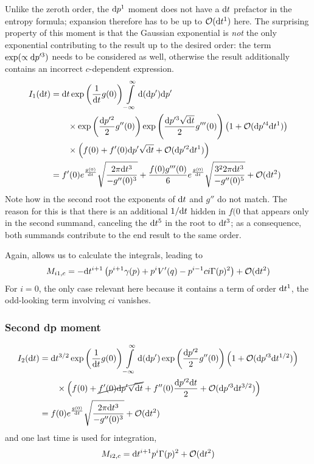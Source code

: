 Unlike the zeroth order, the \(\mathrm{d} p^1\) moment does not have a \(\mathrm{d} t\) prefactor in the entropy formula; expansion therefore has to be up to \(\mathcal{O}(\mathrm{d} t^1)\) here. The surprising property of this moment is that the Gaussian exponential is \emph{not} the only exponential contributing to the result up to the desired order: the term \(\operatorname{exp}(\propto\mathrm{d} p'^3)\) needs to be considered as well, otherwise the result additionally contains an incorrect \(c\)-dependent expression.
%
\begin{align*}
	I_1(\mathrm{d} t)
	&=
	\mathrm{d} t\operatorname{exp}\left(\frac1{\mathrm{d} t}g(0)\right)
	\int\limits_{-\infty}^\infty\mathrm{d}(\mathrm{d} p')\mathrm{d} p'
	\\&\qquad\times
		\operatorname{exp}\left(\frac{\mathrm{d} p'^2}2g''(0)\right)
		\operatorname{exp}\left(\frac{\mathrm{d} p'^3\sqrt{\mathrm{d} t}}2g'''(0)\right)
		\left(1+\mathcal{O}(\mathrm{d} p'^4\mathrm{d} t^1)\right)
	\\&\qquad
	\times\Bigl(
	  f(0)
	+ f'(0)\mathrm{d} p'\sqrt{\mathrm{d} t}
	+ \mathcal{O}(\mathrm{d} p'^2\mathrm{d} t^1)
	\Bigr)
	\\
	&= f'(0)e^{\frac{g(0)}{\mathrm{d} t}}\sqrt{\frac{2\pi\mathrm{d} t^3}{-g''(0)^3}}
	   + \frac{f(0)g'''(0)}6e^{\frac{g(0)}{\mathrm{d} t}}\sqrt{\frac{3^22\pi\mathrm{d} t^3}{-g''(0)^5}}
	   + \mathcal{O}(\mathrm{d} t^2)
\end{align*}
%
Note how in the second root the exponents of \(\mathrm{d} t\) and \(g''\) do not match. The reason for this is that there is an additional \(1/\mathrm{d} t\) hidden in \(f(0\) that appears only in the second summand, canceling the \(\mathrm{d} t^5\) in the root to \(\mathrm{d} t^3\); as a consequence, both summands contribute to the end result to the same order.

Again,  allows us to calculate the integrals, leading to
%
\begin{align}
	M_{i1,c} = -\mathrm{d} t^{i+1}\left(
		p^{i+1}\gamma(p)
		+ p^iV'(q)
		- p^{i-1}ci\Gamma(p)^2\right)
	+ \mathcal{O}(\mathrm{d} t^2)
\end{align}
%
For \(i = 0\), the only case relevant here because it contains a term of order \(\mathrm{d} t^1\), the odd-looking term involving \(ci\) vanishes.

\subsubsection{Second dp moment}

\begin{align*}
	I_2(\mathrm{d} t)
	&=
	\mathrm{d} t^{3/2}\operatorname{exp}\left(\frac1{\mathrm{d} t}g(0)\right)
	\int\limits_{-\infty}^\infty\mathrm{d}(\mathrm{d} p')\operatorname{exp}\left(\frac{\mathrm{d} p'^2}2g''(0)\right)
	\left(1+\mathcal{O}(\mathrm{d} p'^3\mathrm{d} t^{1/2})\right)
	\\&\qquad
	\times\Bigl(
	  f(0)
	+ \cancel{f'(0)\mathrm{d} p'\sqrt{\mathrm{d} t}}
	+ f''(0)\frac{\mathrm{d} p'^2\mathrm{d} t}2
	+ \mathcal{O}(\mathrm{d} p'^3\mathrm{d} t^{3/2})
	\Bigr)
	\\
	&=   f(0)e^{\frac{g(0)}{\mathrm{d} t}}\sqrt{\frac{2\pi\mathrm{d} t^3}{-g''(0)^3}}
	   + \mathcal{O}(\mathrm{d} t^2)
\end{align*}
%
and one last time  is used for integration,
%
\begin{align}
	M_{i2,c} = \mathrm{d} t^{i+1} p^i \Gamma(p)^2 + \mathcal{O}(\mathrm{d} t^2)
\end{align}

